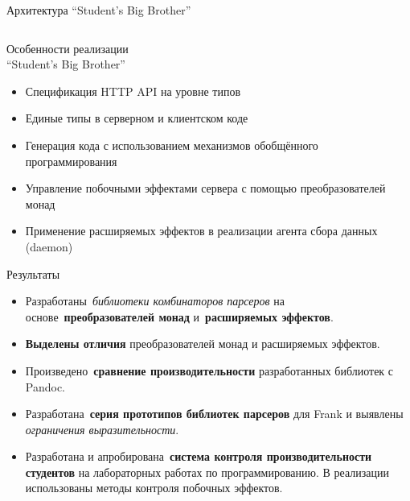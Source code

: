 \begin{frame}[fragile]{Архитектура ``Student's Big Brother''}
\begin{columns}
\begin{column}{0.1\textwidth}

\end{column}
\begin{column}{0.9\textwidth}

\end{column}
\end{columns}
\end{frame}

\begin{frame}[fragile]{Особенности реализации \\ ``Student's Big Brother''}
\begin{itemize}
\item Спецификация HTTP API на уровне типов
\item Единые типы в серверном и клиентском коде
\item Генерация кода с использованием механизмов обобщённого программирования
\item Управление побочными эффектами сервера с помощью преобразователей монад
\item Применение расширяемых эффектов в реализации агента сбора данных (daemon)
\end{itemize}
\end{frame}

\begin{frame}[fragile]{Результаты}
\begin{itemize}
\item Разработаны~\emph{библиотеки комбинаторов парсеров} на
      основе~\textbf{преобразователей монад} и~\textbf{расширяемых эффектов}.
\item \textbf{Выделены отличия} преобразователей монад и расширяемых эффектов.
\item Произведено~\textbf{сравнение производительности} разработанных библиотек с Pandoc.
\item Разработана~\textbf{серия прототипов библиотек парсеров} для Frank и выявлены
      \emph{ограничения выразительности}.
\item Разработана и апробирована~\textbf{система контроля производительности студентов}
      на лабораторных работах по программированию. В реализации использованы методы
      контроля побочных эффектов.
\end{itemize}
\end{frame}

